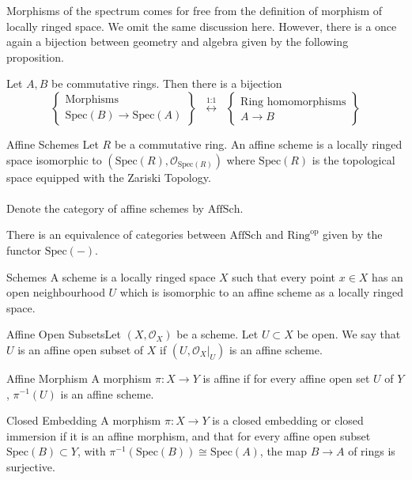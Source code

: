 \documentclass[a4paper]{article}
\begin{document}
Morphisms of the spectrum comes for free from the definition of morphism of locally ringed space. We omit the same discussion here. However, there is a once again a bijection between geometry and algebra given by the following proposition. 

\begin{prp}{}{} Let $A,B$ be commutative rings. Then there is a bijection $$\left\{\substack{\text{Morphisms}\\\text{Spec}(B)\to\text{Spec}(A)}\right\}\;\;\overset{\text{1:1}}{\longleftrightarrow}\;\;\left\{\substack{\text{Ring homomorphisms}\\ A\to B}\right\}$$
\end{prp}

\begin{defn}{Affine Schemes}{} Let $R$ be a commutative ring. An affine scheme is a locally ringed space isomorphic to $(\text{Spec}(R),\mathcal{O}_{\text{Spec}(R)})$ where $\text{Spec}(R)$ is the topological space equipped with the Zariski Topology. \\~\\
Denote the category of affine schemes by $\text{AffSch}$. 
\end{defn}

\begin{thm}{}{} There is an equivalence of categories between $\text{AffSch}$ and $\text{Ring}^{\text{op}}$ given by the functor $\text{Spec}(-)$. 
\end{thm}

\begin{defn}{Schemes}{} A scheme is a locally ringed space $X$ such that every point $x\in X$ has an open neighbourhood $U$ which is isomorphic to an affine scheme as a locally ringed space. 
\end{defn}

\begin{defn}{Affine Open Subsets}{}Let $(X,\mathcal{O}_X)$ be a scheme. Let $U\subset X$ be open.  We say that $U$ is an affine open subset of $X$ if $(U,\mathcal{O}_X|_U)$ is an affine scheme. 
\end{defn}

\begin{defn}{Affine Morphism}{} A morphism $\pi:X\to Y$ is affine if for every affine open set $U$ of $Y$, $\pi^{-1}(U)$ is an affine scheme. 
\end{defn}

\begin{defn}{Closed Embedding}{} A morphism $\pi:X\to Y$ is a closed embedding or closed immersion if it is an affine morphism, and that for every affine open subset $\text{Spec}(B)\subset Y$, with $\pi^{-1}(\text{Spec}(B))\cong\text{Spec}(A)$, the map $B\to A$ of rings is surjective. 
\end{defn}
\end{document}
